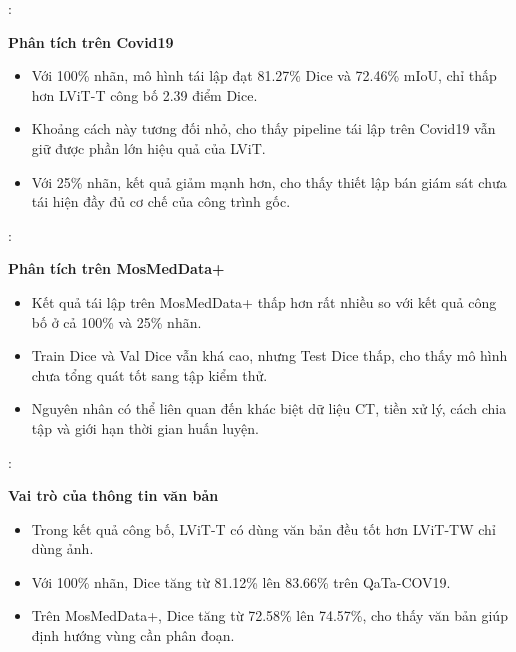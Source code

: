 \begin{frame}{\secname: \subsecname}

\textbf{Phân tích trên Covid19}

\begin{itemize}
    \item Với 100\% nhãn, mô hình tái lập đạt 81.27\% Dice và 72.46\% mIoU, chỉ thấp hơn LViT-T công bố 2.39 điểm Dice.
    \item Khoảng cách này tương đối nhỏ, cho thấy pipeline tái lập trên Covid19 vẫn giữ được phần lớn hiệu quả của LViT.
    \item Với 25\% nhãn, kết quả giảm mạnh hơn, cho thấy thiết lập bán giám sát chưa tái hiện đầy đủ cơ chế của công trình gốc.
\end{itemize}

\end{frame}

\begin{frame}{\secname: \subsecname}

\textbf{Phân tích trên MosMedData+}

\begin{itemize}
    \item Kết quả tái lập trên MosMedData+ thấp hơn rất nhiều so với kết quả công bố ở cả 100\% và 25\% nhãn.
    \item Train Dice và Val Dice vẫn khá cao, nhưng Test Dice thấp, cho thấy mô hình chưa tổng quát tốt sang tập kiểm thử.
    \item Nguyên nhân có thể liên quan đến khác biệt dữ liệu CT, tiền xử lý, cách chia tập và giới hạn thời gian huấn luyện.
\end{itemize}

\end{frame}

\begin{frame}{\secname: \subsecname}

\textbf{Vai trò của thông tin văn bản}

\begin{itemize}
    \item Trong kết quả công bố, LViT-T có dùng văn bản đều tốt hơn LViT-TW chỉ dùng ảnh.
    \item Với 100\% nhãn, Dice tăng từ 81.12\% lên 83.66\% trên QaTa-COV19.
    \item Trên MosMedData+, Dice tăng từ 72.58\% lên 74.57\%, cho thấy văn bản giúp định hướng vùng cần phân đoạn.
\end{itemize}

\end{frame}

